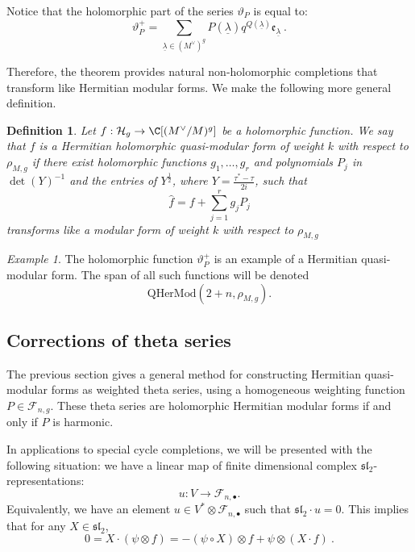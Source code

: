 \documentclass[11pt,letterpaper,english]{amsart}
\numberwithin{equation}{subsection}
\numberwithin{equation}{section}
\newcommand\cF{{\mathcal F}}
\newcommand\cH{{\mathcal H}}
\newcommand{\QHerm}{\mathrm{QHerMod}}
\theoremstyle{plain}
\newtheorem{definition}[theorem]{Definition}
\theoremstyle{remark}
\newtheorem{remarque}[theorem]{Remark}
\newtheorem{example}[theorem]{Example}
\begin{document}
Notice that the holomorphic part of the series $\vartheta_P$ is equal to: 
\[\vartheta_P^+=\sum_{\underline{\lambda}\in (M^\vee)^g }P(\underline{\lambda})q^{Q(\underline{\lambda})}\mathfrak e_{\underline{\lambda}}~.\]

Therefore, the theorem provides natural non-holomorphic completions that transform like Hermitian modular forms. We make the following more general definition. 

\begin{definition}\label{def:quasi-hermitian}
    Let $f:\cH_g\rightarrow \C[(M^\vee/M)^g]$ be a holomorphic function. We say that $f$ is a Hermitian holomorphic quasi-modular form of weight $k$ with respect to $\rho_{M,g}$ if there exist holomorphic functions $g_1,\ldots,g_r$ and polynomials $P_j$ in $\det(Y)^{-1}$ and the entries of $Y^{\frac{1}{2}}$, where $Y=\frac{\tau^*-\tau}{2i}$, such that 
    \[\widehat{f}=f+\sum_{j=1}^rg_j P_j\] 
    transforms like a modular form of weight $k$ with respect to $\rho_{M,g}$ 
\end{definition}





\begin{example}
    The holomorphic function $\vartheta_P^+$ is an example of a Hermitian quasi-modular form. The span of all such functions will be denoted 
    $$\QHerm(2+n,\rho_{M,g}).$$
\end{example}


\subsection{Corrections of theta series} The previous section gives a general method for constructing Hermitian quasi-modular forms as weighted theta series, using a homogeneous weighting function $P\in \cF_{n,g}$. These theta series are holomorphic Hermitian modular forms if and only if $P$ is harmonic. 

In applications to special cycle completions, we will be presented with the following situation: we have a linear map of finite dimensional complex $\mathfrak{sl}_2$-representations:
$$u:V\to \cF_{n,\bullet}.$$
Equivalently, we have an element $u\in V^* \otimes \cF_{n,\bullet}$ such that $\mathfrak{sl}_2\cdot u=0$. This implies that for any $X\in \mathfrak{sl}_2$, 
$$0=X\cdot (\psi\otimes f) = -(\psi\circ X)\otimes f + \psi\otimes (X\cdot f)~.$$
\end{document}
